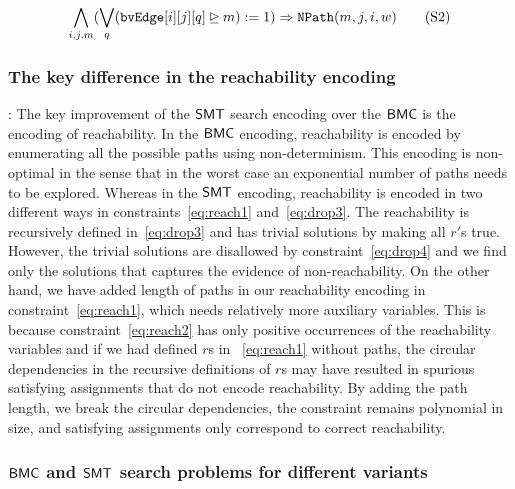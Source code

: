 \begin{align}
	\bigwedge\limits_{i,j,m} (\bigvee_{q} (\texttt{bvEdge}[i][j][q] \unrhd m) := 1) \Rightarrow \texttt{NPath}(m, j, i, w)
  \tag{S2}\label{eq:reachbmc2}
\end{align}


\subsubsection{The key difference in the reachability encoding}:
The key improvement of the $\mathsf{SMT}$ search encoding over the $\mathsf{BMC}$ is the
encoding of reachability.
%
In the $\mathsf{BMC}$ encoding, reachability is encoded by enumerating all the possible paths using non-determinism.
%
This encoding is non-optimal in the sense that in the worst case an exponential number of paths needs to be explored.
%
Whereas in the $\mathsf{SMT}$ encoding, reachability is encoded in two different
ways in constraints~\eqref{eq:reach1} and~\eqref{eq:drop3}.
%
The reachability is recursively defined in~\eqref{eq:drop3} and has
trivial solutions by making all $r'$s true.
%
However, the trivial solutions are disallowed by constraint~\eqref{eq:drop4} and we find
only the solutions that captures the evidence of non-reachability.
%
On the other hand, we have added length of paths in our reachability encoding in constraint~\eqref{eq:reach1}, which needs relatively more auxiliary variables.
%
This is because constraint~\eqref{eq:reach2} has only positive
occurrences of the reachability variables and if we had defined
$r$s in ~\eqref{eq:reach1} without paths,
the circular dependencies in the recursive definitions of $r$s
may have resulted in spurious satisfying assignments that
do not encode reachability.
%
By adding the path length, we break the circular dependencies, the
constraint remains polynomial in size, and satisfying assignments only
correspond to correct reachability.



\subsubsection{$\mathsf{BMC}$ and $\mathsf{SMT}$ search problems for different variants}

